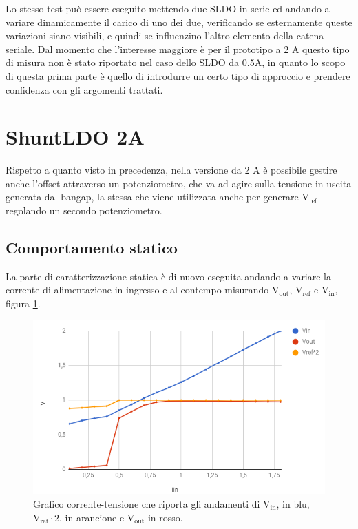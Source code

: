 Lo stesso test può essere eseguito mettendo due SLDO in serie ed andando a variare dinamicamente il carico di uno dei due, verificando se esternamente queste variazioni siano visibili, e quindi se influenzino l'altro elemento della catena seriale. 
Dal momento che l'interesse maggiore è per il prototipo a 2 A questo tipo di misura non è stato riportato nel caso dello SLDO da 0.5A, in quanto lo scopo di questa prima parte è quello di introdurre un certo tipo di approccio e  prendere confidenza con gli argomenti trattati.

\section{ShuntLDO 2A}
Rispetto a quanto visto in precedenza, nella versione da 2 A è possibile gestire anche l'offset attraverso un potenziometro, che va ad agire sulla tensione in uscita generata dal bangap, la stessa che viene utilizzata anche per generare $\mathrm{V_{ref}}$ regolando un secondo potenziometro. 

\subsection{Comportamento statico}
La parte di caratterizzazione statica è di nuovo eseguita andando a variare la corrente di alimentazione in ingresso e al contempo misurando $\mathrm{V_{out}}$, $\mathrm{V_{ref}}$ e $\mathrm{V_{in}}$, figura \ref{SLDO2Astatic}.

\begin{figure}
\centering
\includegraphics[scale=.5]{Immagini/SLDO2Astatic}
\caption{Grafico corrente-tensione che riporta gli andamenti di $\mathrm{V_{in}}$, in blu, $\mathrm{V_{ref}\cdot 2}$, in arancione e $\mathrm{V_{out}}$ in rosso.}
\label{SLDO2Astatic}
\end{figure}

